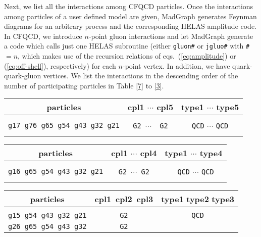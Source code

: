 Next, we list all the interactions among CFQCD particles. Once the
 interactions
 among particles of a
user defined model are given, MadGraph generates Feynman diagrams for an arbitrary
process and the corresponding HELAS amplitude code. In CFQCD, we
introduce $n$-point gluon interactions and let MadGraph
generate a code which calls just one HELAS subroutine (either {\tt gluon\#}
or {\tt jgluo\#} with {\tt \#} $=n$, which makes use of the recursion relations of
eqs.~(\ref{eq:amplitude}) or (\ref{eq:off-shell}), respectively) for each
 $n$-point vertex. In addition, we have
 quark-quark-gluon vertices. We list the interactions in the descending order of the
 number of participating particles in Table \ref{7} to \ref{3}.
\begin{table*}
\centering
\caption{7-point vertices}
\label{7}
\begin{tabular}{ccc}
\hline
\hline
particles&cpl1 $\cdots$ cpl5&type1 $\cdots$ type5\\
\hline\\
 {\tt g17 g76 g65 g54 g43 g32 g21}&{\tt G2}\;\, $\cdots$\;\, {\tt
     G2}&{\tt QCD}\;\; $\cdots$\;\; {\tt QCD}\\\\
\hline
\hline
\end{tabular}
\vspace{2em}
\caption{6-point vertices}
\label{6}
\begin{tabular}{ccc}
\hline
\hline
particles&cpl1 $\cdots$ cpl4&type1 $\cdots$ type4\\
\hline\\
{\tt g16 g65 g54 g43 g32 g21}&{\tt G2}\;\, $\cdots$\;\, {\tt G2}& {\tt
	 QCD}\;\; $\cdots$\;\; {\tt QCD}\\\\
\hline
\hline
\end{tabular}
\vspace{2em}
\caption{5-point vertices}
\label{5}
\begin{tabular}{ccc}
\hline
\hline
particles&cpl1\, cpl2\, cpl3&type1\,\,type2\,\,type3\\
\hline\\
{\tt g15 g54 g43 g32 g21}&{\tt G2}\hspace{1.2em}{\tt
     G2}\hspace{1.2em}{\tt G2}&{\tt QCD}\hspace{1.2em}{\tt
	 QCD}\hspace{1.2em}{\tt QCD}\\
{\tt g26 g65 g54 g43 g32}&{\tt G2}\hspace{1.2em}{\tt
}
\end{tabular}
\end{table*}
